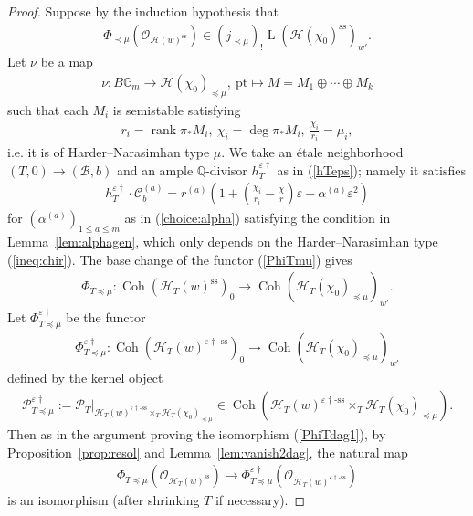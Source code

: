\documentclass[11pt,oneside,a4paper,mathscr]{amsart}
\theoremstyle{definition}
\renewcommand{\leq}{\leqslant}
\newcommand{\LL}{\operatorname{L}}
\newcommand{\cH}{\mathcal{H}}
\newcommand{\cB}{\mathcal{B}}
\newcommand{\cC}{\mathcal{C}}
\newcommand{\cP}{\mathcal{P}}
\newcommand{\bgm}{B\mathbb{G}_m}
\newcommand{\Coh}{\operatorname{Coh}}
\newcommand{\vd}{\varepsilon\dag}
\begin{document}
\begin{proof}
Suppose by the induction hypothesis that 
\begin{align}\label{induct:mu2}
    \Phi_{\prec \mu}(\mathcal{O}_{\cH(w)^{\mathrm{ss}}})
\in (j_{\prec \mu})_{!}\LL(\cH(\chi_0)^{\mathrm{ss}})_{w'}.
\end{align}
Let $\nu$ be a map 
\begin{align*}
    \nu \colon \bgm \to \cH(\chi_0)_{\preceq \mu}, \ \mathrm{pt} \mapsto 
    M=M_1 \oplus \cdots \oplus M_k
\end{align*}
such that each $M_i$ is semistable
satisfying 
\begin{align}\label{ineq:chir}
r_i=\operatorname{rank}\pi_{*}M_i, \ 
\chi_i=\deg \pi_{*}M_i, \ 
\frac{\chi_i}{r_i}=\mu_i, 
\end{align}
i.e. it is of Harder--Narasimhan type $\mu$. 
We take an \'{e}tale neighborhood $(T, 0)\to (\cB, b)$ and an ample $\mathbb{Q}$-divisor $h_T^{\varepsilon\dag}$ as in (\ref{hTeps});
namely it satisfies 
\begin{align}\label{def:hTedag}
    h_T^{\varepsilon \dag}\cdot \cC_b^{(a)}=r^{(a)}\left(1+\left(\frac{\chi_i}{r_i}-\frac{\chi}{r}  \right)\varepsilon +\alpha^{(a)}\varepsilon^2   \right)
\end{align}
for $(\alpha^{(a)})_{1\leq a\leq m}$ as in (\ref{choice:alpha})
satisfying the condition in Lemma~\ref{lem:alphagen}, which only depends on 
the Harder--Narasimhan type (\ref{ineq:chir}). 
The base change of the functor (\ref{PhiTmu}) gives 
\begin{align*}
    \Phi_{T\preceq \mu} \colon \Coh(\cH_T(w)^{\mathrm{ss}})_0 \to 
    \Coh(\cH_T(\chi_0)_{\preceq \mu})_{w'}.
\end{align*}
Let $\Phi_{T\preceq \mu}^{\varepsilon\dag}$ be the functor 
\begin{align}\label{funct:edag2}
   \Phi_{T\preceq \mu}^{\varepsilon\dag} \colon \Coh(\cH_T(w)^{\varepsilon\dag\text{-ss}})_0 \to 
   \Coh(\cH_T(\chi_0)_{\preceq \mu})_{w'}
\end{align}
defined by the kernel object 
\begin{align}\label{PTprecmu}
\cP_{T\preceq \mu}^{\vd}:=
    \mathcal{P}_T|_{\cH_T(w)^{\varepsilon\dag\text{-ss}}\times_T \cH_T(\chi_0)_{\preceq \mu}}\in \Coh(\cH_T(w)^{\varepsilon\dag\text{-ss}}\times_T \cH_T(\chi_0)_{\preceq \mu}).
\end{align}
Then as in the argument proving the isomorphism (\ref{PhiTdag1}), 
by Proposition~\ref{prop:resol} and Lemma~\ref{lem:vanish2dag}, 
the natural map 
\begin{align}\label{nat:isom}
    \Phi_{T \preceq \mu}(\mathcal{O}_{\cH_T(w)^{\mathrm{ss}}})\to \Phi_{T\preceq \mu}^{\varepsilon\dag}(\mathcal{O}_{\cH_T(w)^{\varepsilon\dag\text{-ss}}})
\end{align}
is an isomorphism (after shrinking $T$ if necessary). 



\end{proof}
\end{document}
